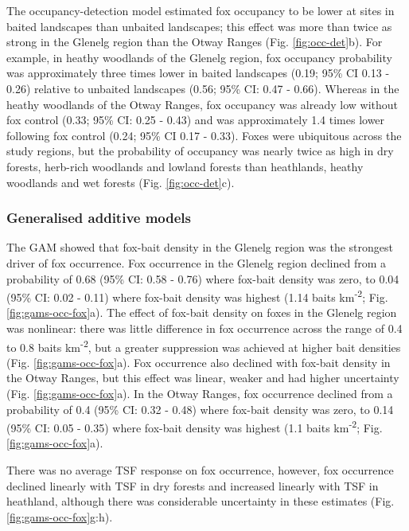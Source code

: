 \documentclass[]{elsarticle} %
\begin{document}
The occupancy-detection model estimated fox occupancy to be lower at sites in baited landscapes than unbaited landscapes; this effect was more than twice as strong in the Glenelg region than the Otway Ranges (Fig. \ref{fig:occ-det}b). For example, in heathy woodlands of the Glenelg region, fox occupancy probability was approximately three times lower in baited landscapes (0.19; 95\% CI 0.13 - 0.26) relative to unbaited landscapes (0.56; 95\% CI: 0.47 - 0.66). Whereas in the heathy woodlands of the Otway Ranges, fox occupancy was already low without fox control (0.33; 95\% CI: 0.25 - 0.43) and was approximately 1.4 times lower following fox control (0.24; 95\% CI 0.17 - 0.33). Foxes were ubiquitous across the study regions, but the probability of occupancy was nearly twice as high in dry forests, herb-rich woodlands and lowland forests than heathlands, heathy woodlands and wet forests (Fig. \ref{fig:occ-det}c).

\hypertarget{generalised-additive-models-1}{%
\subsubsection{Generalised additive models}\label{generalised-additive-models-1}}

The GAM showed that fox-bait density in the Glenelg region was the strongest driver of fox occurrence. Fox occurrence in the Glenelg region declined from a probability of 0.68 (95\% CI: 0.58 - 0.76) where fox-bait density was zero, to 0.04 (95\% CI: 0.02 - 0.11) where fox-bait density was highest (1.14 baits km\textsuperscript{-2}; Fig. \ref{fig:gams-occ-fox}a). The effect of fox-bait density on foxes in the Glenelg region was nonlinear: there was little difference in fox occurrence across the range of 0.4 to 0.8 baits km\textsuperscript{-2}, but a greater suppression was achieved at higher bait densities (Fig. \ref{fig:gams-occ-fox}a). Fox occurrence also declined with fox-bait density in the Otway Ranges, but this effect was linear, weaker and had higher uncertainty (Fig. \ref{fig:gams-occ-fox}a). In the Otway Ranges, fox occurrence declined from a probability of 0.4 (95\% CI: 0.32 - 0.48) where fox-bait density was zero, to 0.14 (95\% CI: 0.05 - 0.35) where fox-bait density was highest (1.1 baits km\textsuperscript{-2}; Fig. \ref{fig:gams-occ-fox}a).

There was no average TSF response on fox occurrence, however, fox occurrence declined linearly with TSF in dry forests and increased linearly with TSF in heathland, although there was considerable uncertainty in these estimates (Fig. \ref{fig:gams-occ-fox}g:h).
\end{document}
